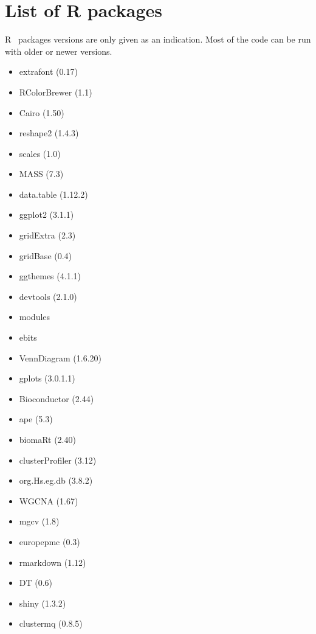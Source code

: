 \chapter{List of R packages}\label{sec:Rpackages}

\textsf{R}~ packages versions are only given as an indication.
Most of the code can be run with older or newer versions.

\begin{multicols}{2}
    \hspace{-1cm}\begin{itemize}
    \item extrafont (0.17)~
    \item RColorBrewer (1.1)~
    \item Cairo (1.50)~
    \item reshape2 (1.4.3)~
    \item scales (1.0)~
    \item MASS (7.3)~
    \item data.table (1.12.2)~
    \item ggplot2 (3.1.1)~
    \item gridExtra (2.3)~
    \item gridBase (0.4)~
    \item ggthemes (4.1.1)~
    \item devtools (2.1.0)~
    \item modules~
    \item ebits~
    \item VennDiagram (1.6.20)~
    \item gplots (3.0.1.1)~
    \item Bioconductor (2.44)~
    \item ape (5.3)~
    \item biomaRt (2.40)~
    \item clusterProfiler (3.12)~
    \item org.Hs.eg.db (3.8.2)~
    \item WGCNA (1.67)~
    \item mgcv (1.8)~
    \item europepmc (0.3)~
    \item rmarkdown (1.12)~
    \item DT (0.6)~
    \item shiny (1.3.2)~
    \item clustermq (0.8.5)~
\end{itemize}
\end{multicols}



